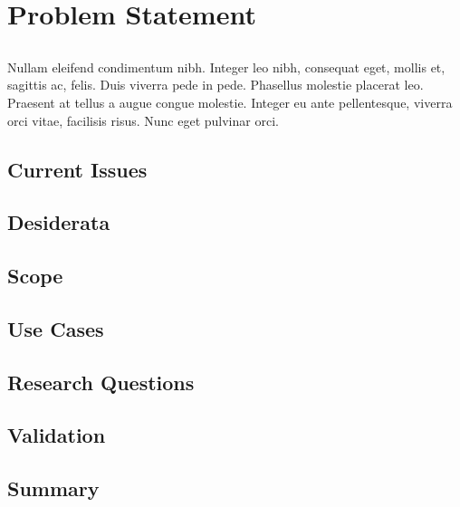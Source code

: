 \chapter{Problem Statement} \label{chap:problem_statement}

\section*{}

Nullam eleifend condimentum nibh. Integer leo nibh, consequat eget,
mollis et, sagittis ac, felis. Duis viverra pede in pede. Phasellus
molestie placerat leo. Praesent at tellus a augue congue molestie.
Integer eu ante pellentesque, viverra orci vitae, facilisis
risus. Nunc eget pulvinar orci.


\section{Current Issues}

\section{Desiderata}

\section{Scope}

\section{Use Cases}

\section{Research Questions}

\section{Validation}

\section{Summary}
